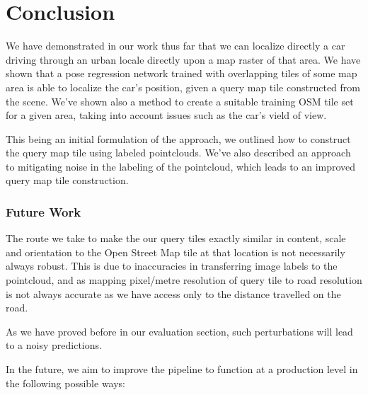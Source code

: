 \chapter{Conclusion}
We have demonstrated in our work thus far that we can localize directly a car driving through an urban locale directly upon a map raster of that area. We have shown that a pose regression network trained with overlapping tiles of some map area is able to localize the car's position, given a query map tile constructed from the scene. We've shown also a method to create a suitable training OSM tile set for a given area, taking into account issues such as the car's vield of view.

This being an initial formulation of the approach, we outlined how to construct the query map tile using labeled pointclouds. We've also described an approach to mitigating noise in the labeling of the pointcloud, which leads to an improved query map tile construction. 

\subsection{Future Work}
The route we take to make the our query tiles exactly similar in content, scale and orientation to the Open Street Map tile at that location is not necessarily always robust. This is due to inaccuracies in transferring image labels to the pointcloud, and as mapping pixel/metre resolution of query tile to road resolution is not always accurate as we have access only to the distance travelled on the road.
	
As we have proved before in our evaluation section, such perturbations will lead to a noisy predictions. 

In the future, we aim to improve the pipeline to function at a production level in the following possible ways:

